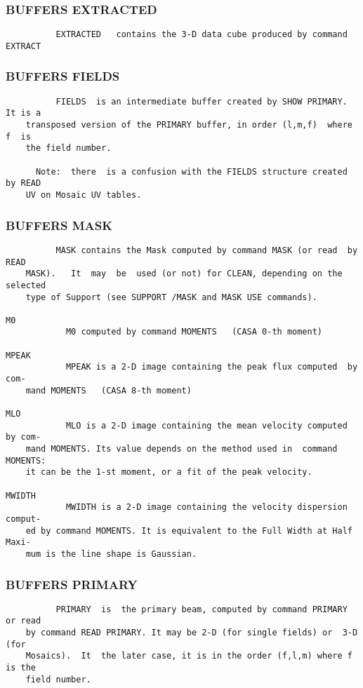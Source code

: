\subsubsection{BUFFERS EXTRACTED}
\begin{verbatim}
          EXTRACTED   contains the 3-D data cube produced by command EXTRACT

\end{verbatim}
\subsubsection{BUFFERS FIELDS}
\begin{verbatim}
          FIELDS  is an intermediate buffer created by SHOW PRIMARY. It is a
    transposed version of the PRIMARY buffer, in order (l,m,f)  where  f  is
    the field number.

      Note:  there  is a confusion with the FIELDS structure created by READ
    UV on Mosaic UV tables.

\end{verbatim}
\subsubsection{BUFFERS MASK}
\begin{verbatim}
          MASK contains the Mask computed by command MASK (or read  by  READ
    MASK).   It  may  be  used (or not) for CLEAN, depending on the selected
    type of Support (see SUPPORT /MASK and MASK USE commands).

M0
            M0 computed by command MOMENTS   (CASA 0-th moment)

MPEAK
            MPEAK is a 2-D image containing the peak flux computed  by  com-
    mand MOMENTS   (CASA 8-th moment)

MLO
            MLO is a 2-D image containing the mean velocity computed by com-
    mand MOMENTS. Its value depends on the method used in  command  MOMENTS:
    it can be the 1-st moment, or a fit of the peak velocity.

MWIDTH
            MWIDTH is a 2-D image containing the velocity dispersion comput-
    ed by command MOMENTS. It is equivalent to the Full Width at Half  Maxi-
    mum is the line shape is Gaussian.

\end{verbatim}
\subsubsection{BUFFERS PRIMARY}
\begin{verbatim}
          PRIMARY  is  the primary beam, computed by command PRIMARY or read
    by command READ PRIMARY. It may be 2-D (for single fields) or  3-D  (for
    Mosaics).  It  the later case, it is in the order (f,l,m) where f is the
    field number.

\end{verbatim}

